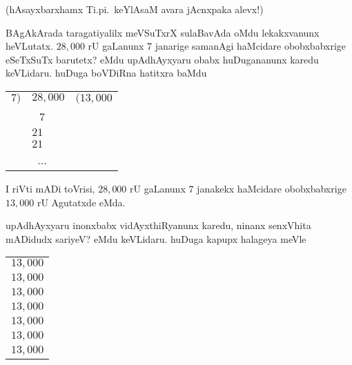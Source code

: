 (hAsayxbarxhamx Ti.pi.\ keYlAsaM avara jAcnxpaka alevx!)

\bigskip

\noindent
\begin{minipage}[c]{6cm}
BAgAkArada taragatiyalilx meVSuTxrX sulaBavAda oMdu lekakxvanunx heVLutatx. $28,000$ rU gaLanunx $7$ janarige samanAgi haMcidare obobxbabxrige eSeTxSuTx barutetx? eMdu upAdhAyxyaru obabx huDugananunx karedu keVLidaru. huDuga boVDiRna hatitxra baMdu
\end{minipage}
\quad
\begin{minipage}[c]{4cm}
\begin{center}
\begin{tabular}{r@{\,}l@{\,}l}
$7\Big)$ & $28,000$ & $\Big(13,000$\\
     & ~\,$7$ & \\
\cline{2-2}
     & $21$ &\\
     & $21$ &\\
\cline{2-2}
     & ~... &  
\end{tabular}
\end{center}
\end{minipage}

\medskip

I riVti mADi toVrisi, $28,000$ rU gaLanunx $7$ janakekx haMcidare obobxbabxrige $13,000$ rU Agutatxde eMda.

\bigskip

\noindent
\begin{minipage}[c]{5.5cm}
upAdhAyxyaru inonxbabx vidAyxthiRyanunx karedu, ninanx senxVhita mADidudx sariyeV? eMdu keVLidaru. huDuga kapupx halageya meVle
\end{minipage}
\quad
\begin{minipage}[c]{4cm}
\begin{center}
\begin{tabular}{l}
$13,000$\\
$13,000$\\
$13,000$\\
$13,000$\\
$13,000$\\
$13,000$\\
$13,000$\\
\hline
\end{tabular}
\end{center}
\end{minipage}

\newpage


